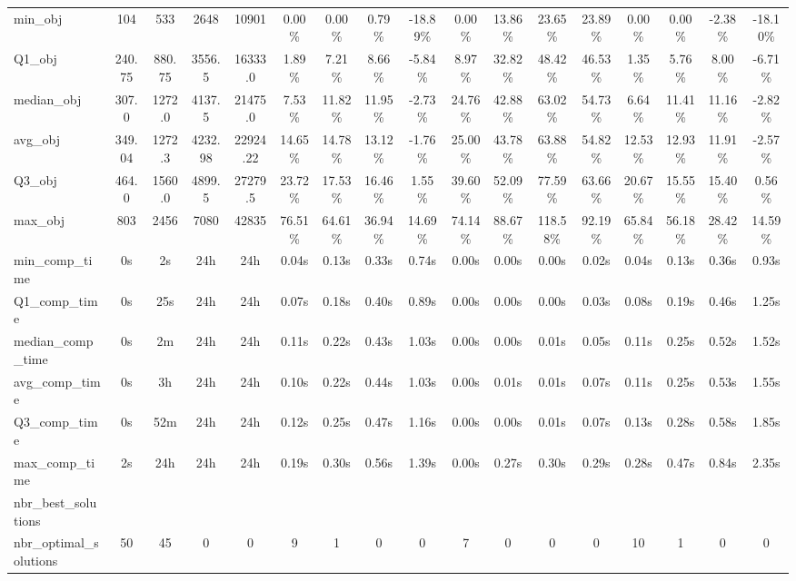 \begin{tabular}{lcccccccccccccccc}
min_obj & 104 & 533 & 2648 & 10901 & 0.00\% & 0.00\% & 0.79\% & -18.89\% & 0.00\% & 13.86\% & 23.65\% & 23.89\% & 0.00\% & 0.00\% & -2.38\% & -18.10\% \\
Q1_obj & 240.75 & 880.75 & 3556.5 & 16333.0 & 1.89\% & 7.21\% & 8.66\% & -5.84\% & 8.97\% & 32.82\% & 48.42\% & 46.53\% & 1.35\% & 5.76\% & 8.00\% & -6.71\% \\
median_obj & 307.0 & 1272.0 & 4137.5 & 21475.0 & 7.53\% & 11.82\% & 11.95\% & -2.73\% & 24.76\% & 42.88\% & 63.02\% & 54.73\% & 6.64\% & 11.41\% & 11.16\% & -2.82\% \\
avg_obj & 349.04 & 1272.3 & 4232.98 & 22924.22 & 14.65\% & 14.78\% & 13.12\% & -1.76\% & 25.00\% & 43.78\% & 63.88\% & 54.82\% & 12.53\% & 12.93\% & 11.91\% & -2.57\% \\
Q3_obj & 464.0 & 1560.0 & 4899.5 & 27279.5 & 23.72\% & 17.53\% & 16.46\% & 1.55\% & 39.60\% & 52.09\% & 77.59\% & 63.66\% & 20.67\% & 15.55\% & 15.40\% & 0.56\% \\
max_obj & 803 & 2456 & 7080 & 42835 & 76.51\% & 64.61\% & 36.94\% & 14.69\% & 74.14\% & 88.67\% & 118.58\% & 92.19\% & 65.84\% & 56.18\% & 28.42\% & 14.59\% \\
min_comp_time & 0s & 2s & 24h & 24h & 0.04s & 0.13s & 0.33s & 0.74s & 0.00s & 0.00s & 0.00s & 0.02s & 0.04s & 0.13s & 0.36s & 0.93s \\
Q1_comp_time & 0s & 25s & 24h & 24h & 0.07s & 0.18s & 0.40s & 0.89s & 0.00s & 0.00s & 0.00s & 0.03s & 0.08s & 0.19s & 0.46s & 1.25s \\
median_comp_time & 0s & 2m & 24h & 24h & 0.11s & 0.22s & 0.43s & 1.03s & 0.00s & 0.00s & 0.01s & 0.05s & 0.11s & 0.25s & 0.52s & 1.52s \\
avg_comp_time & 0s & 3h & 24h & 24h & 0.10s & 0.22s & 0.44s & 1.03s & 0.00s & 0.01s & 0.01s & 0.07s & 0.11s & 0.25s & 0.53s & 1.55s \\
Q3_comp_time & 0s & 52m & 24h & 24h & 0.12s & 0.25s & 0.47s & 1.16s & 0.00s & 0.00s & 0.01s & 0.07s & 0.13s & 0.28s & 0.58s & 1.85s \\
max_comp_time & 2s & 24h & 24h & 24h & 0.19s & 0.30s & 0.56s & 1.39s & 0.00s & 0.27s & 0.30s & 0.29s & 0.28s & 0.47s & 0.84s & 2.35s \\
nbr_best_solutions &  &  &  &  &  &  &  &  &  &  &  &  &  &  &  &  \\
nbr_optimal_solutions & 50 & 45 & 0 & 0 & 9 & 1 & 0 & 0 & 7 & 0 & 0 & 0 & 10 & 1 & 0 & 0 \\
\bottomrule
\end{tabular}
